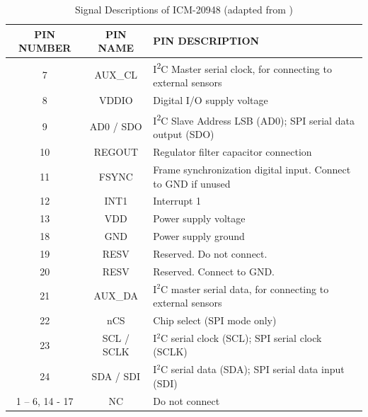 \begin{table}[htbp]
    \centering
    \renewcommand{\arraystretch}{1.2}
    \begin{tabular}{|c|c|p{5cm}|}
        \hline
        \rowcolor[gray]{0.8} \textbf{PIN NUMBER} & \textbf{PIN NAME} & \textbf{PIN DESCRIPTION} \\
        \hline
        7 & AUX\_CL & I\textsuperscript{2}C Master serial clock, for connecting to external sensors \\
        \hline
        8 & VDDIO & Digital I/O supply voltage \\
        \hline
        9 & AD0 / SDO & I\textsuperscript{2}C Slave Address LSB (AD0); SPI serial data output (SDO) \\
        \hline
        10 & REGOUT & Regulator filter capacitor connection \\
        \hline
        11 & FSYNC & Frame synchronization digital input. Connect to GND if unused \\
        \hline
        12 & INT1 & Interrupt 1 \\
        \hline
        13 & VDD & Power supply voltage \\
        \hline
        18 & GND & Power supply ground \\
        \hline
        19 & RESV & Reserved. Do not connect. \\
        \hline
        20 & RESV & Reserved. Connect to GND. \\
        \hline
        21 & AUX\_DA & I$^2$C master serial data, for connecting to external sensors \\
        \hline
        22 & nCS & Chip select (SPI mode only) \\
        \hline
        23 & SCL / SCLK & I$^2$C serial clock (SCL); SPI serial clock (SCLK) \\
        \hline
        24 & SDA / SDI & I$^2$C serial data (SDA); SPI serial data input (SDI) \\
        \hline
        1 -- 6, 14 - 17 & NC & Do not connect \\
        \hline
    \end{tabular}
    \caption{Signal Descriptions of ICM-20948 (adapted from \protect\cite{TDK:2024})}
    \label{tab:signal_descriptions}
\end{table}

